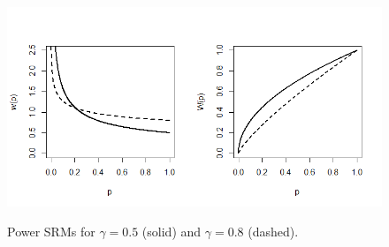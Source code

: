 \documentclass[11pt,a4paper,english]{article}
\begin{document}
\begin{figure}
	\begin{center}
		\includegraphics[scale = 0.7]{Figures/Fig2-1.png}\\
	\end{center}
	\caption{Power SRMs for $\gamma=0.5$ (solid) and $\gamma=0.8$ (dashed).}\label{Fig2:PSRM}
\end{figure}		
\end{document}
